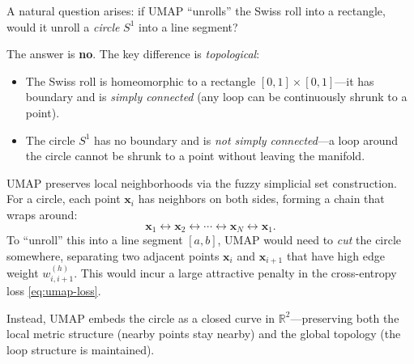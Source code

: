 \begin{example}\label{ex:circle-topology}
  A natural question arises: if UMAP ``unrolls'' the Swiss roll into a rectangle, would it unroll a \emph{circle} $S^1$ into a line segment?

  The answer is \textbf{no}. The key difference is \emph{topological}:
  \begin{itemize}
    \item The Swiss roll is homeomorphic to a rectangle $[0,1] \times [0,1]$---it has boundary and is \emph{simply connected} (any loop can be continuously shrunk to a point).
    \item The circle $S^1$ has no boundary and is \emph{not simply connected}---a loop around the circle cannot be shrunk to a point without leaving the manifold.
  \end{itemize}

  UMAP preserves local neighborhoods via the fuzzy simplicial set construction. For a circle, each point $\mathbf{x}_i$ has neighbors on both sides, forming a chain that wraps around:
  \[
    \mathbf{x}_1 \leftrightarrow \mathbf{x}_2 \leftrightarrow \cdots \leftrightarrow \mathbf{x}_N \leftrightarrow \mathbf{x}_1.
  \]
  To ``unroll'' this into a line segment $[a,b]$, UMAP would need to \emph{cut} the circle somewhere, separating two adjacent points $\mathbf{x}_i$ and $\mathbf{x}_{i+1}$ that have high edge weight $w_{i,i+1}^{(h)}$. This would incur a large attractive penalty in the cross-entropy loss \eqref{eq:umap-loss}.

  Instead, UMAP embeds the circle as a closed curve in $\mathbb{R}^2$---preserving both the local metric structure (nearby points stay nearby) and the global topology (the loop structure is maintained).
\end{example}

